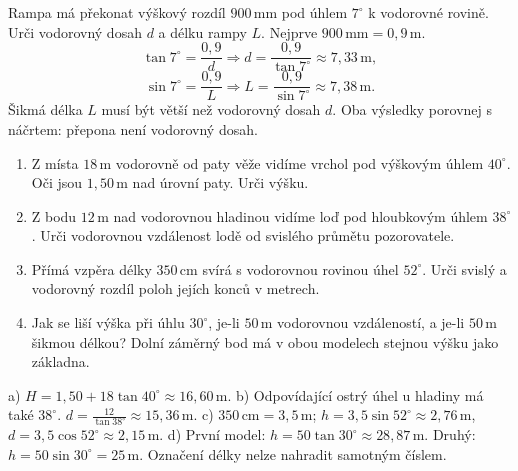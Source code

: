 \documentclass[11pt,a4paper]{article}
\begin{document}
\begin{prikladReseniBox}[title={P3: potřebujeme dosah i délku rampy},breakable=false]
Rampa má překonat výškový rozdíl $900\,\mathrm{mm}$ pod úhlem $7^\circ$
k vodorovné rovině. Urči vodorovný dosah $d$ a délku rampy $L$.
\tcblower
Nejprve $900\,\mathrm{mm}=0{,}9\,\mathrm m$.
\[
\tan7^\circ=\frac{0{,}9}{d}\Rightarrow
d=\frac{0{,}9}{\tan7^\circ}\approx7{,}33\,\mathrm m,
\]
\[
\sin7^\circ=\frac{0{,}9}{L}\Rightarrow
L=\frac{0{,}9}{\sin7^\circ}\approx7{,}38\,\mathrm m.
\]
Šikmá délka $L$ musí být větší než vodorovný dosah $d$.
Oba výsledky porovnej s náčrtem: přepona není vodorovný dosah.
\end{prikladReseniBox}

\begin{zadaniReseniBox}[title={S1: model, vzorec, jednotka, kontrola},breakable=false]
\begin{enumerate}[label=\alph*)]
\item Z místa $18\,\mathrm m$ vodorovně od paty věže vidíme vrchol
pod výškovým úhlem $40^\circ$. Oči jsou $1{,}50\,\mathrm m$ nad úrovní paty. Urči výšku.
\item Z bodu $12\,\mathrm m$ nad vodorovnou hladinou vidíme loď pod hloubkovým úhlem
$38^\circ$. Urči vodorovnou vzdálenost lodě od svislého průmětu pozorovatele.
\item Přímá vzpěra délky $350\,\mathrm{cm}$ svírá s vodorovnou rovinou úhel $52^\circ$.
Urči svislý a vodorovný rozdíl poloh jejích konců v metrech.
\item Jak se liší výška při úhlu $30^\circ$, je-li $50\,\mathrm m$
vodorovnou vzdáleností, a je-li $50\,\mathrm m$ šikmou délkou?
Dolní záměrný bod má v obou modelech stejnou výšku jako základna.
\end{enumerate}
\tcblower
a) $H=1{,}50+18\tan40^\circ\approx16{,}60\,\mathrm m$.
b) Odpovídající ostrý úhel u hladiny má také $38^\circ$.
$d=\frac{12}{\tan38^\circ}\approx15{,}36\,\mathrm m$.
c) $350\,\mathrm{cm}=3{,}5\,\mathrm m$;
$h=3{,}5\sin52^\circ\approx2{,}76\,\mathrm m$,
$d=3{,}5\cos52^\circ\approx2{,}15\,\mathrm m$.
d) První model: $h=50\tan30^\circ\approx28{,}87\,\mathrm m$.
Druhý: $h=50\sin30^\circ=25\,\mathrm m$.
Označení délky nelze nahradit samotným číslem.
\end{zadaniReseniBox}
\end{document}
